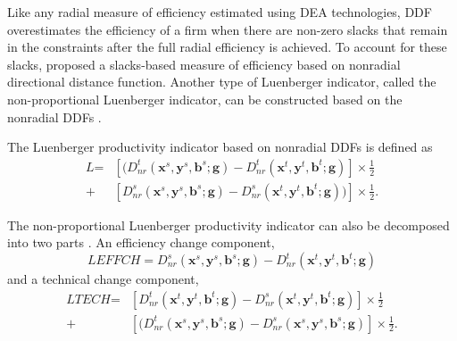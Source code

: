 Like any radial measure of efficiency estimated using DEA technologies, DDF overestimates the efficiency of a firm when there are non-zero slacks that remain in the constraints after the full radial efficiency is achieved. 
To account for these slacks, \cite{Fare2010} proposed a slacks-based measure of efficiency based on nonradial directional distance function. Another type of Luenberger indicator, called the non-proportional Luenberger indicator, can be constructed based on the nonradial DDFs \citep{Mahlberg2011}. 

The Luenberger productivity indicator based on nonradial DDFs is defined as
\begin{equation}\begin{split}\label{eq_li_nr}
    \textit{L} %
    = & \left[ (D _{nr}^t({{\pmb{x}}^s},{{\pmb{y}}^s},{{\pmb{b}}^s};{\pmb{g}}) - D _{nr}^t({{\pmb{x}}^t},{{\pmb{y}}^t},{{\pmb{b}}^t};{\pmb{g}}) \right] \times \frac{1}{2} \\ 
    + & \left[ D _{nr}^s({{\pmb{x}}^s},{{\pmb{y}}^s},{{\pmb{b}}^s};{\pmb{g}}) - D _{nr}^s({{\pmb{x}}^t},{{\pmb{y}}^t},{{\pmb{b}}^t};{\pmb{g}})) \right] \times \frac{1}{2}.
\end{split}\end{equation}

The non-proportional Luenberger productivity indicator can also be decomposed into two parts \citep{Mahlberg2011}. An efficiency change component,
\begin{equation}
    \textit{LEFFCH} %
    = D _{nr}^s({{\pmb{x}}^s},{{\pmb{y}}^s},{{\pmb{b}}^s};{\pmb{g}}) - D _{nr}^t({{\pmb{x}}^t},{{\pmb{y}}^t},{{\pmb{b}}^t};{\pmb{g}})
\end{equation}
and a technical change component,
\begin{equation}\begin{split}
    \textit{LTECH} %
    = & \left[ D _{nr}^t({{\pmb{x}}^t},{{\pmb{y}}^t},{{\pmb{b}}^t};{\pmb{g}}) - D _{nr}^s({{\pmb{x}}^t},{{\pmb{y}}^t},{{\pmb{b}}^t};{\pmb{g}}) \right] \times \frac{1}{2} \\ 
    + & \left[ (D _{nr}^t({{\pmb{x}}^s},{{\pmb{y}}^s},{{\pmb{b}}^s};{\pmb{g}}) - D _{nr}^s({{\pmb{x}}^s},{{\pmb{y}}^s},{{\pmb{b}}^s};{\pmb{g}}) \right] \times \frac{1}{2}.
\end{split}\end{equation}


